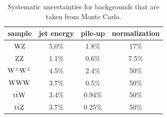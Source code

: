 \begin{table}[htb]
    \centering
\begin{tabular}{*4c}
    \toprule
    sample       &    jet energy & pile-up & normalization \\
    \midrule
$\mathrm{W}\mathrm{Z}$             & 5.0\%  & 1.8\%  & 17\%    \\
$\mathrm{Z}\mathrm{Z}$             & 1.1\%  & 0.6\%  & 7.5\% \\
$\mathrm{W}^{\pm}\mathrm{W}^{\pm}$ & 4.5\%  & 2.4\%  & 50\% \\
$\mathrm{W}\mathrm{W}\mathrm{W}$            & 3.7\%  & 0.5\%  & 50\% \\
$\mathrm{t}\bar{\mathrm{t}} \mathrm{W}$       & 3.4\%  & 0.94\% & 50\% \\
$\mathrm{t}\bar{\mathrm{t}} \mathrm{Z}$       & 3.7\%  & 0.25\% & 50\% \\
\bottomrule
\end{tabular}
\caption{Systematic uncertainties for backgrounds that are taken from Monte Carlo.}
\label{tab:MConlySystematics}
\end{table}

